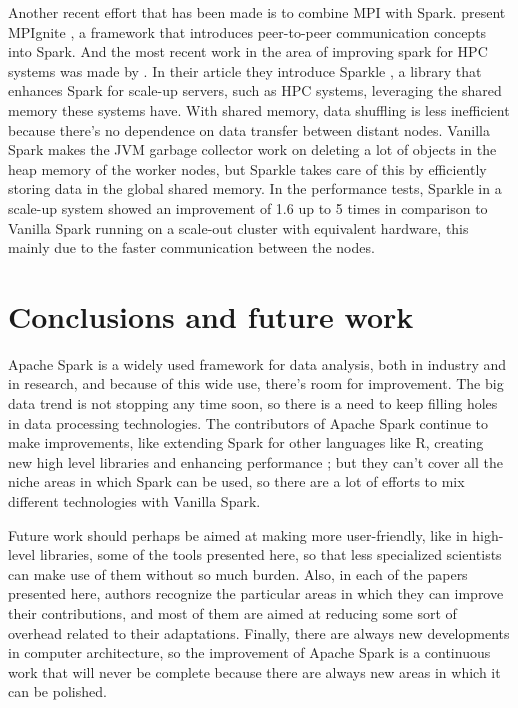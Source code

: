 \documentclass{article}
\begin{document}
Another recent effort that has been made is to combine MPI with Spark. \citeauthor{Morris2017} present MPIgnite \cite{Morris2017}, a framework that introduces peer-to-peer communication concepts into Spark. And the most recent work in the area of improving spark for HPC systems was made by \citeauthor{kim2017sparkle}. In their article they introduce Sparkle \cite{kim2017sparkle}, a library that enhances Spark for scale-up servers, such as HPC systems, leveraging the shared memory these systems have. With shared memory, data shuffling is less inefficient because there's no dependence on data transfer between distant nodes. Vanilla Spark makes the JVM garbage collector work on deleting a lot of objects in the heap memory of the worker nodes, but Sparkle takes care of this by efficiently storing data in the global shared memory. In the performance tests, Sparkle in a scale-up system showed an improvement of 1.6 up to 5 times in comparison to Vanilla Spark running on a scale-out cluster with equivalent hardware, this mainly due to the faster communication between the nodes.


\section{Conclusions and future work}
\label{sec:conclusion}

Apache Spark is a widely used framework for data analysis, both in industry and in research, and because of this wide use, there's room for improvement. The big data trend is not stopping any time soon, so there is a need to keep filling holes in data processing technologies. The contributors of Apache Spark continue to make improvements, like extending Spark for other languages like R, creating new high level libraries and enhancing performance \cite{zaharia_apache_2016}; but they can't cover all the niche areas in which Spark can be used, so there are a lot of efforts to mix different technologies with Vanilla Spark.

Future work should perhaps be aimed at making more user-friendly, like in high-level libraries, some of the tools presented here, so that less specialized scientists can make use of them without so much burden. Also, in each of the papers presented here, authors recognize the particular areas in which they can improve their contributions, and most of them are aimed at reducing some sort of overhead related to their adaptations. Finally, there are always new developments in computer architecture, so the improvement of Apache Spark is a continuous work that will never be complete because there are always new areas in which it can be polished.


\printbibliography
\end{document}

